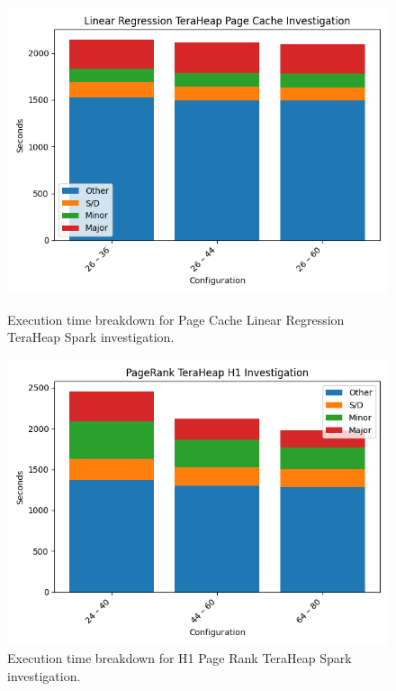 \begin{figure}[thbp]
    \includegraphics[width=\linewidth]{./fig/linr_pc_th.png}
    \caption{Execution time breakdown for Page Cache Linear Regression TeraHeap Spark investigation.}
    \label{fig:linr_pc_th}

    \includegraphics[width=\linewidth]{./fig/pr_h1_th.png}
    \caption{Execution time breakdown for H1 Page Rank TeraHeap Spark
    investigation.} 
    \label{fig:pr_h1_th}
\end{figure}

